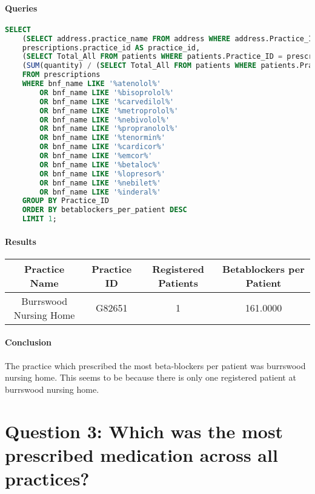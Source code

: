 \documentclass{report}
\begin{document}
\paragraph{Queries}
\begin{lstlisting}[language=SQL, caption=Question 2 query]
SELECT 
    (SELECT address.practice_name FROM address WHERE address.Practice_ID = prescriptions.PRACTICE_ID group by practice_id) AS Practice_name, 
    prescriptions.practice_id AS practice_id,
	(SELECT Total_All FROM patients WHERE patients.Practice_ID = prescriptions.Practice_ID) AS registered_patients,
    (SUM(quantity) / (SELECT Total_All FROM patients WHERE patients.Practice_id = prescriptions.practice_id)) AS betablockers_per_patient 
    FROM prescriptions 
    WHERE bnf_name LIKE '%atenolol%' 
        OR bnf_name LIKE '%bisoprolol%' 
        OR bnf_name LIKE '%carvedilol%' 
        OR bnf_name LIKE '%metroprolol%' 
        OR bnf_name LIKE '%nebivolol%' 
        OR bnf_name LIKE '%propranolol%' 
        OR bnf_name LIKE '%tenormin%' 
        OR bnf_name LIKE '%cardicor%' 
        OR bnf_name LIKE '%emcor%' 
        OR bnf_name LIKE '%betaloc%' 
        OR bnf_name LIKE '%lopresor%' 
        OR bnf_name LIKE '%nebilet%' 
        OR bnf_name LIKE '%inderal%' 
    GROUP BY Practice_ID 
    ORDER BY betablockers_per_patient DESC 
    LIMIT 1;
\end{lstlisting}
\paragraph{Results}
\begin{center}
\begin{tabular}{ | c | c | c | c | }
\hline
Practice Name & Practice ID & Registered Patients & Betablockers per Patient \\
\hline
Burrswood Nursing Home & G82651 & 1 & 161.0000 \\
\hline
\end{tabular}
\end{center}
\paragraph{Conclusion}
The practice which prescribed the most beta-blockers per patient was burrswood nursing home. This seems to be because there is only one registered patient at burrswood nursing home.

\section{Question 3: Which was the most prescribed medication across all practices?}
\end{document}
